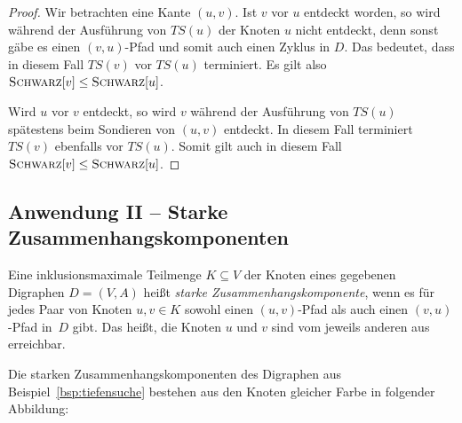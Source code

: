 \begin{proof}
	Wir betrachten eine Kante $(u,v)$. Ist $v$ vor $u$ entdeckt worden, so wird während der Ausführung von $TS(u)$ der Knoten $u$ nicht entdeckt, denn sonst gäbe es einen $(v,u)$-Pfad und somit auch einen Zyklus in $D$. Das bedeutet, dass in diesem Fall $TS(v)$ vor $TS(u)$ terminiert. Es gilt also $\mathop{\text{\textsc{Schwarz}}}[v] \le \mathop{\text{\textsc{Schwarz}}}[u]$. 
	
	Wird $u$ vor $v$ entdeckt, so wird $v$ während der Ausführung von $TS(u)$ spätestens beim Sondieren von $(u,v)$ entdeckt. In diesem Fall terminiert $TS(v)$ ebenfalls vor $TS(u)$. Somit gilt auch in diesem Fall $\mathop{\text{\textsc{Schwarz}}}[v] \le \mathop{\text{\textsc{Schwarz}}}[u]$.
\end{proof}




\subsection{Anwendung II -- Starke Zusammenhangskomponenten}

\begin{defn}
Eine inklusionsmaximale Teilmenge $K \subseteq V$ der Knoten eines gegebenen Digraphen $D=(V,A)$ heißt \emph{starke Zusammenhangskomponente}, wenn es für jedes Paar von Knoten $u,v \in K$ sowohl einen $(u,v)$-Pfad als auch einen $(v,u)$-Pfad in~$D$ gibt.
Das heißt, die Knoten $u$ und $v$ sind vom jeweils anderen aus erreichbar.
\end{defn} 

\begin{bsp}
\label{bsp:starke-zusammenhangskomponenten}
Die starken Zusammenhangskomponenten des Digraphen aus Beispiel~\ref{bsp:tiefensuche} bestehen aus den Knoten gleicher Farbe in folgender Abbildung:

\hfill
{}
\hfill\,
\end{bsp}

